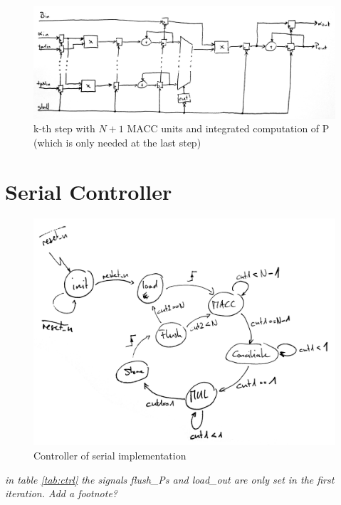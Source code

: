 \documentclass[mscthesis]{usiinfthesis}
\begin{document}
\begin{figure}
    \includegraphics[width=1\columnwidth]{./schema/arch_step_p.png}
    \caption{k-th step with $ N+1 $ MACC units and integrated computation of P
        (which is only needed at the last step)}
    \label{fig:step_p}
\end{figure}

\section{Serial Controller}

\begin{figure}
    \includegraphics[width=1\columnwidth]{./schema/arch_ctrl.png}
    \caption{Controller of serial implementation}
    \label{fig:ctrl}
\end{figure}

\emph{\color{red} in table \ref{tab:ctrl} the signals flush\_Ps and load\_out
are only set in the first iteration. Add a footnote?}
\end{document}
